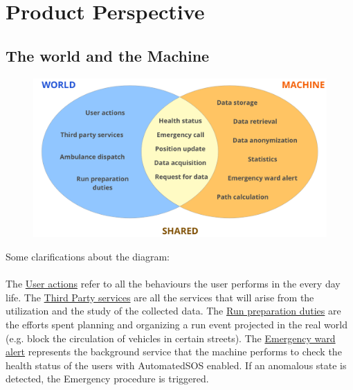 \section{Product Perspective}
\subsection{The world and the Machine}
\begin{figure}[H]
    \centering
    \includegraphics[scale=0.3]{./Pictures/worldmachine.png}

\end{figure}

Some clarifications about the diagram: \\ \\
The \underline{User actions} refer to all the behaviours the user performs in the every day life. The \underline{Third Party services} are all the services that will arise from the utilization and the study of the collected data. The \underline{Run preparation duties} are the efforts spent planning and organizing a run event projected in the real world (e.g. block the circulation of vehicles in certain streets). The \underline{Emergency ward alert} represents the background service that the machine performs to check the health status of the users with AutomatedSOS enabled. If an anomalous state is detected, the Emergency procedure is triggered.

\newpage
